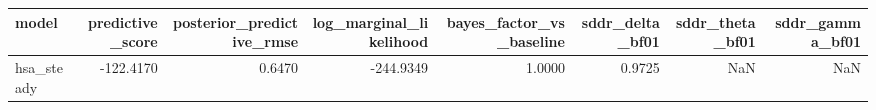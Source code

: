 \begin{tabular}{lrrrrrrr}
\toprule
model & predictive\_score & posterior\_predictive\_rmse & log\_marginal\_likelihood & bayes\_factor\_vs\_baseline & sddr\_delta\_bf01 & sddr\_theta\_bf01 & sddr\_gamma\_bf01 \\
\midrule
hsa\_steady & -122.4170 & 0.6470 & -244.9349 & 1.0000 & 0.9725 & NaN & NaN \\
\bottomrule
\end{tabular}
